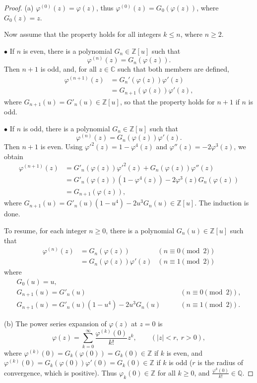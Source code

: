 \documentclass[11pt,a4paper]{article}
\newcommand{\Q}{\mathbb{Q}}
\newcommand{\Z}{\mathbb{Z}}
\newcommand{\C}{\mathbb{C}}
\begin{document}
\begin{proof}
\item[(a)] $\varphi^{(0)}(z) = \varphi(z)$, thus $\varphi^{(0)}(z) = G_0(\varphi(z))$, where  $G_0(z) = z$.

Now assume that the property holds for all integers $k \leq n$, where $n\geq 2$.

$\bullet$ If $n$ is even, there is a polynomial $G_n \in \Z[u]$ such that
$$ \varphi^{(n)}(z) = G_n(\varphi(z)).$$
Then $n+1$ is odd, and, for all $z\in \C$ such that both members are defined,
\begin{align*}
\varphi^{(n+1)}(z) &= G_n'(\varphi(z)) \varphi'(z)\\
&=G_{n+1}(\varphi(z)) \varphi'(z),
\end{align*}
where $G_{n+1}(u) = G'_n(u) \in \Z[u]$, so that the property holds for $n+1$ if $n$ is odd.

$\bullet$ If $n$ is odd, there is a polynomial $G_n\in \Z[u]$ such that
$$\varphi^{(n)}(z) = G_n(\varphi(z))\varphi'(z).$$
Then $n+1$ is even. Using $\varphi'^2(z) = 1 - \varphi^4(z)$ and $\varphi''(z) = -2 \varphi^3(z)$, we obtain
\begin{align*}
\varphi^{(n+1)}(z) &= G'_n(\varphi(z)) \varphi'^2(z) + G_n(\varphi(z)) \varphi''(z)\\
&=G'_n(\varphi(z)) (1- \varphi^4(z)) -2 \varphi^3(z) G_n(\varphi(z))\\
&=G_{n+1}(\varphi(z)),
\end{align*}
where $G_{n+1}(u) = G'_n(u)(1-u^4) - 2 u^3 G_n(u) \in \Z[u]$. The induction is done.

To resume, for each integer $n  \geq 0$, there is a polynomial $G_n(u) \in \Z[u]$ such that
$$\begin{array}{lll}
\varphi^{(n)}(z) &= G_n(\varphi(z)) &(n \equiv 0 \pmod 2)\\
		    &= G_n(\varphi(z))\varphi'(z) & (n \equiv 1 \pmod 2)
\end{array}$$
where
$$\begin{array}{ll}
G_0(u) = u,&\\
G_{n+1}(u) = G'_n(u)  &\qquad (n \equiv 0 \pmod 2),\\
G_{n+1}(u) = G'_n(u)(1-u^4) - 2 u^3 G_n(u) &\qquad (n \equiv 1 \pmod 2).
\end{array}$$
\item[(b)] The power series expansion of $\varphi(z)$ at $z=0$ is
$$\varphi(z) = \sum_{k=0}^\infty \frac{\varphi^{(k)}(0)} {k!} z^k, \qquad (|z| < r,\ r>0),$$
where $\varphi^{(k)}(0) = G_k(\varphi(0)) = G_k(0) \in \Z$ if $k$ is even, and $\varphi^{(k)}(0) = G_k(\varphi(0)) \varphi'(0) = G_k(0) \in \Z$ if $k$ is odd ($r$ is the radius of convergence, which is positive). Thus $\varphi_k(0) \in \Z$ for all $k\geq 0$, and $\frac{\varphi^{k}(0)}{k!} \in \Q$.  


\end{proof}
\end{document}
